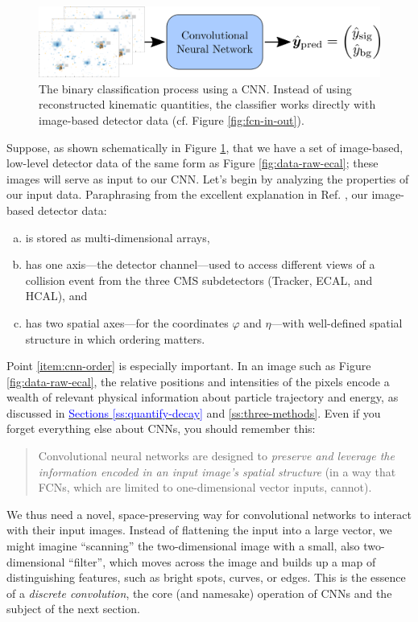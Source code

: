 \documentclass[11pt, a4paper]{article}
\newcommand{\myhref}[2]{\hyperref[#1]{\textcolor{blue}{#2}}}
\begin{document}
\begin{figure}[htb!]
    \centering
    \includegraphics[width=0.9\linewidth]{raster/raster-svg/cnn-in-out.png}
    \caption{The binary classification process using a CNN.
    Instead of using reconstructed kinematic quantities, the classifier works directly with image-based detector data (cf. Figure \ref{fig:fcn-in-out}).}
    \label{fig:ccn-in-out}
\end{figure}

Suppose, as shown schematically in Figure \ref{fig:ccn-in-out}, that we have a set of image-based, low-level detector data of the same form as Figure \ref{fig:data-raw-ecal}; these images will serve as input to our CNN.
Let's begin by analyzing the properties of our input data.
Paraphrasing from the excellent explanation in Ref. \cite{cnn-guide}, our image-based detector data:
\begin{enumerate}[(a)]

    \item is stored as multi-dimensional arrays,

    \item has one axis---the detector channel---used to access different views of a collision event from the three CMS subdetectors (Tracker, ECAL, and HCAL), and %

    \item \label{item:cnn-order} has two spatial axes---for the coordinates $ \varphi $ and $ \eta $---with well-defined spatial structure in which ordering matters.

\end{enumerate}
Point \ref{item:cnn-order} is especially important.
In an image such as Figure \ref{fig:data-raw-ecal}, the relative positions and intensities of the pixels encode a wealth of relevant physical information about particle trajectory and energy, as discussed in \myhref{ss:quantify-decay}{Sections \ref{ss:quantify-decay}} and \ref{ss:three-methods}.
Even if you forget everything else about CNNs, you should remember this:
\begin{quote}
    Convolutional neural networks are designed to \textit{preserve and leverage the information encoded in an input image's spatial structure} (in a way that FCNs, which are limited to one-dimensional vector inputs, cannot).
\end{quote}
We thus need a novel, space-preserving way for convolutional networks to interact with their input images.
Instead of flattening the input into a large vector, we might imagine ``scanning'' the two-dimensional image with a small, also two-dimensional ``filter'', which moves across the image and builds up a map of distinguishing features, such as bright spots, curves, or edges.
This is the essence of a \textit{discrete convolution}, the core (and namesake) operation of CNNs and the subject of the next section.
\end{document}
